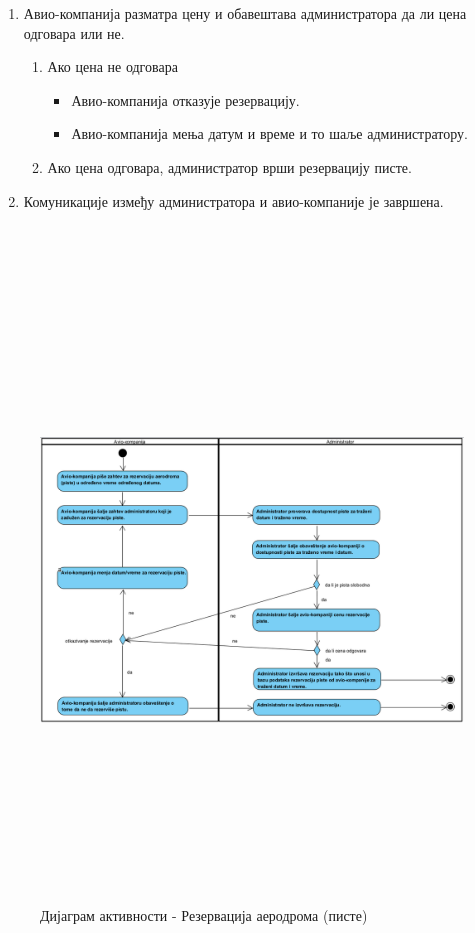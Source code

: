 \documentclass{article}
\begin{document}
\begin{itemize}
\begin{enumerate}
\begin{enumerate}
                \end{enumerate}
            \item Авио-компанија разматра цену и обавештава администратора да ли цена одговара или не.
                 \begin{enumerate}
                    \item Ако цена не одговара 
                        \begin{itemize}
                            \item Авио-компанија отказује резервацију.
                            \item Авио-компанија мења датум и време и то шаље администратору.
                        \end{itemize}
                    \item Ако цена одговара, администратор врши резервацију писте.
                \end{enumerate}
        \item Комуникације између администратора и авио-компаније је завршена.
    \end{enumerate}
\end{itemize}\\

\begin{figure}[h!]
    \centering
    \includegraphics[width=1.1\textwidth, height=17cm]{Dijagrami_slike/rezervacija_aerodroma.png}
    \caption{Дијаграм активности - Резервација аеродрома (писте)}
\end{figure}
\end{document}
